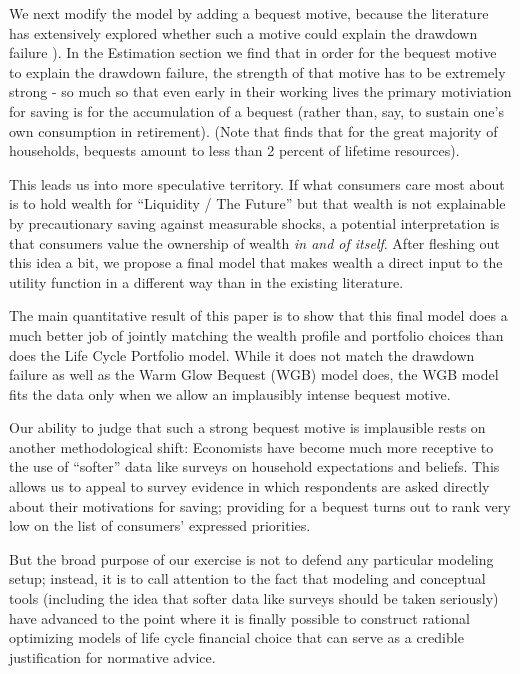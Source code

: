 \documentclass{article}
\begin{document}
We next modify the model by adding a bequest motive, because the literature has extensively explored whether such a motive could explain the drawdown failure \cite{DeNardi2016d}).
In the Estimation section we find that in order for the bequest motive to explain the drawdown failure, the strength of that motive has to be extremely strong - so much so that even early in their working lives the primary motiviation for saving is for the accumulation of a bequest (rather than, say, to sustain one's own consumption in retirement). (Note that \cite{Hendricks_2002} finds that for the great majority of households, bequests amount to less than 2 percent of lifetime resources).

This leads us into more speculative territory.
If what consumers care most about is to hold wealth for ``Liquidity / The Future'' but that wealth is not explainable by precautionary saving against measurable shocks, a potential interpretation is that consumers value the ownership of wealth \textit{in and of itself}.
After fleshing out this idea a bit, we propose a final model that makes wealth a direct input to the utility function in a different way than in the existing literature.

The main quantitative result of this paper is to show that this final model does a much better job of jointly matching the wealth profile and portfolio choices than does the Life Cycle Portfolio model. While it does not match the drawdown failure as well as the Warm Glow Bequest (WGB) model does, the WGB model fits the data only when we allow an implausibly intense bequest motive.

Our ability to judge that such a strong bequest motive is implausible rests on another methodological shift: Economists have become much more receptive to the use of ``softer'' data like surveys on household expectations and beliefs.
This allows us to appeal to survey evidence in which respondents are asked directly about their motivations for saving; providing for a bequest turns out to rank very low on the list of consumers' expressed priorities.

But the broad purpose of our exercise is not to defend any particular modeling setup; instead, it is to call attention to the fact that modeling and conceptual tools (including the idea that softer data like surveys should be taken seriously) have advanced to the point where it is finally possible to construct rational optimizing models of life cycle financial choice that can serve as a credible justification for normative advice.
\end{document}
